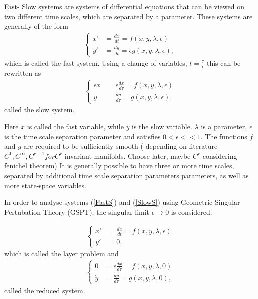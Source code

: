
Fast- Slow systems are systems of differential equations that can be viewed on two different time scales, which are separated by a parameter.
These systems are generally of the form
\begin{align} \label{FastS}
\begin{cases}
x' &=\frac{dx}{dt}= f(x,y,\lambda, \epsilon)\\
y' &= \frac{dy}{dt}= \epsilon g( x,y, \lambda, \epsilon),
\end{cases}
\end{align}
which is called the fast system.
Using a change of variables, $t = \frac{\tau}{\epsilon} $ this can be rewritten as
\begin{align}
\begin{cases}
\epsilon \dot{x} &= \epsilon \frac{dx}{d \tau} = f(x,y,\lambda, \epsilon)\\
\dot{y} & = \frac{dy}{d \tau} =  g( x,y, \lambda, \epsilon),
\end{cases}\label{SlowS}
\end{align}
called the slow system.

Here $x$ is called the fast variable, while $y$ is the slow variable. $\lambda$ is a parameter, $\epsilon$ is the time scale separation parameter and satisfies $0< \epsilon << 1$. The functions $f$ and $g$ are required to be sufficiently smooth ( depending on literature $C^1, C^\infty, C^{r+1} for C^r$ invariant manifolds. Choose later, maybe $C^r$ considering fenichel theorem)
It is generally possible to have three or more time scales, separated by additional time scale separation parameters parameters, as well as more state-space variables. 

In order to analyse systems (\ref{FastS}) and (\ref{SlowS}) using Geometric Singular Pertubation Theory (GSPT), the singular limit $\epsilon \to 0$ is considered:

\begin{align} \label{FastS0}
\begin{cases}
x' &=\frac{dx}{dt}= f(x,y,\lambda, \epsilon)\\
y' &= 0,
\end{cases}
\end{align}
which is called the layer problem and
\begin{align}\label{SlowS0}
\begin{cases}
0 &= \epsilon \frac{dx}{d \tau} = f(x,y,\lambda, 0)\\
\dot{y} & = \frac{dy}{d \tau} =  g( x,y, \lambda,0),
\end{cases}
\end{align}
called the reduced system.


